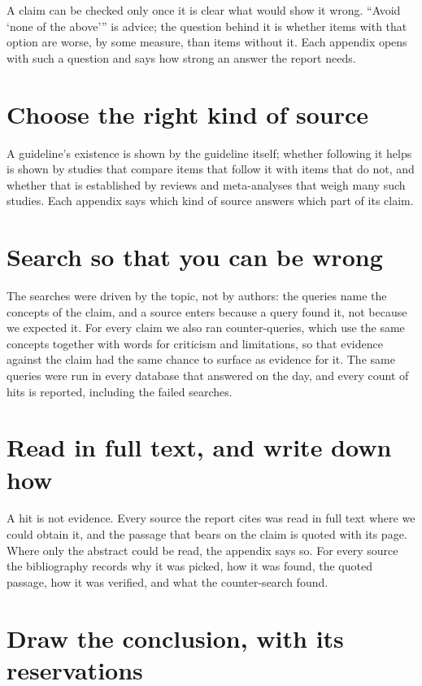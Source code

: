 A claim can be checked only once it is clear what would show it wrong.
\enquote{Avoid \enquote{none of the above}} is advice; the question behind
it is whether items with that option are worse, by some measure, than items
without it.  Each appendix opens with such a question and says how strong
an answer the report needs.

\section{Choose the right kind of source}

A guideline's existence is shown by the guideline itself; whether
following it helps is shown by studies that compare items that follow it
with items that do not, and whether that is established by reviews and
meta-analyses that weigh many such studies.  Each appendix says which kind
of source answers which part of its claim.

\section{Search so that you can be wrong}

The searches were driven by the topic, not by authors: the queries name
the concepts of the claim, and a source enters because a query found it,
not because we expected it.  For every claim we also ran counter-queries,
which use the same concepts together with words for criticism and
limitations, so that evidence against the claim had the same chance to
surface as evidence for it.  The same queries were run in every database
that answered on the day, and every count of hits is reported, including
the failed searches.

\section{Read in full text, and write down how}

A hit is not evidence.  Every source the report cites was read in full
text where we could obtain it, and the passage that bears on the claim is
quoted with its page.  Where only the abstract could be read, the appendix
says so.  For every source the bibliography records why it was picked,
how it was found, the quoted passage, how it was verified, and what the
counter-search found.

\section{Draw the conclusion, with its reservations}

